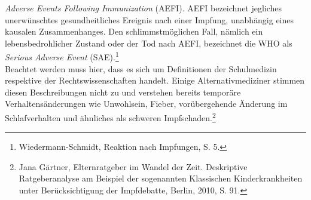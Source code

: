 \documentclass[
    a4paper,
    12pt,
    hyphens,
    chapterprefix=true,
    headheight=33pt,
    footheight=29pt,
    headings=optiontohead, %
]{scrartcl}
\begin{document}
\textit{Adverse Events Following Immunization} (AEFI). AEFI bezeichnet jegliches unerwünschtes 
gesundheitliches Ereignis nach einer Impfung, unabhängig eines kausalen Zusammenhanges. Den schlimmstmöglichen Fall, nämlich ein lebensbedrohlicher 
Zustand oder der Tod nach AEFI, bezeichnet die WHO als \textit{Serious Adverse Event} (SAE).\footnote{Wiedermann-Schmidt, Reaktion nach Impfungen, S. 5.}\\
Beachtet werden muss hier, dass es sich um Definitionen der Schulmedizin respektive der Rechtswissenschaften handelt. Einige Alternativmediziner 
stimmen diesen Beschreibungen nicht zu und verstehen bereits temporäre Verhaltensänderungen wie Unwohlsein, Fieber, vorübergehende Änderung im Schlafverhalten und ähnliches als schweren Impfschaden.\footnote{Jana Gärtner, Elternratgeber im Wandel der Zeit. 
Deskriptive Ratgeberanalyse am Beispiel der sogenannten Klassischen Kinderkrankheiten unter Berücksichtigung der Impfdebatte, Berlin, 2010, S. 91.}
\end{document}
